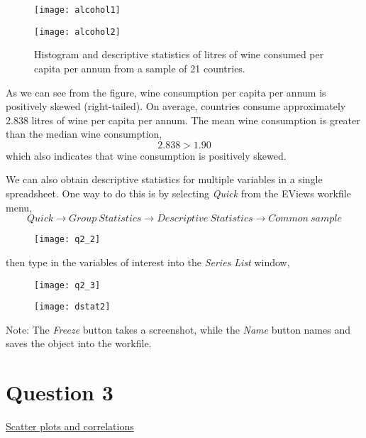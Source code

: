 \documentclass[12pt]{report}
\begin{document}
		\begin{figure}[H]
			\centerline{\texttt{[image: alcohol1]}}
		\end{figure}
		\vspace{-\baselineskip}
		\begin{figure}[H]
			\centerline{\texttt{[image: alcohol2]}}
			\caption{Histogram and descriptive statistics of litres of wine consumed per capita per annum from a sample of 21 countries.}
			\label{fig:hist1}
		\end{figure}
		\vspace{-\baselineskip}
		\noindent As we can see from the figure, wine consumption per capita per annum is positively skewed (right-tailed). On average, countries consume approximately 2.838 litres of wine per capita per annum. The mean wine consumption is greater than the median wine consumption, $$2.838 > 1.90$$ which also indicates that wine consumption is positively skewed. \par
		\newpage
		\noindent We can also obtain descriptive statistics for multiple variables in a single spreadsheet. One way to do this is by selecting \textit{Quick} from the EViews workfile menu,
		$$Quick \to Group\ Statistics \to Descriptive\ Statistics \to Common\ sample$$
		\begin{figure}[H]
			\centerline{\texttt{[image: q2\_2]}}
		\end{figure}
		\vspace{-\baselineskip}
		\noindent then type in the variables of interest into the \textit{Series List} window,
		\begin{figure}[H]
			\centerline{\texttt{[image: q2\_3]}}
		\end{figure}		
		\vspace{-\baselineskip}
		\begin{figure}[H]
			\centerline{\texttt{[image: dstat2]}}
		\end{figure}	
		\vspace{-\baselineskip}
		\noindent Note: The \textit{Freeze} button takes a screenshot, while the \textit{Name} button names and saves the object into the workfile.

	\newpage	
	\section*{Question 3}
	\underline{Scatter plots and correlations}
		
\end{document}
